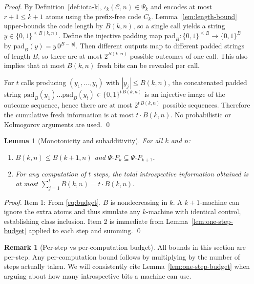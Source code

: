 \documentclass[11pt]{article}
\newtheorem{lemma}[theorem]{Lemma}
\theoremstyle{plain}
\theoremstyle{definition}
\newtheorem{remark}[theorem]{Remark}
\newcommand{\PSi}{\Psi}
\newcommand{\bits}{\{0,1\}}
\begin{document}
\begin{proof}
By Definition~\ref{def:iota-k}, $\iota_k(\mathcal{C},n)\in\PSi_k$ and encodes at most $r+1\le k+1$ atoms using the prefix-free code $C_k$. Lemma~\ref{lem:length-bound} upper-bounds the code length by $B(k,n)$, so a single call yields a string $y\in\bits^{\le B(k,n)}$. Define the injective padding map $\mathrm{pad}_B: \bits^{\le B}\to\bits^{B}$ by $\mathrm{pad}_B(y)=y\,0^{B-|y|}$. Then different outputs map to different padded strings of length $B$, so there are at most $2^{B(k,n)}$ possible outcomes of one call. This also implies that at most $B(k,n)$ fresh bits can be revealed per call.

For $t$ calls producing $(y_1,\ldots,y_t)$ with $|y_j|\le B(k,n)$, the concatenated padded string $\mathrm{pad}_B(y_1)\ldots\mathrm{pad}_B(y_t)\in\bits^{t\,B(k,n)}$ is an injective image of the outcome sequence, hence there are at most $2^{t\,B(k,n)}$ possible sequences. Therefore the cumulative fresh information is at most $t\cdot B(k,n)$. No probabilistic or Kolmogorov arguments are used. \qed
\end{proof}

\begin{lemma}[Monotonicity and subadditivity]
\label{lem:monotone}
For all $k$ and $n$:
\begin{enumerate}
  \item $B(k,n)\le B(k+1,n)$ and $\PSi\text{-}P_k\subseteq \PSi\text{-}P_{k+1}$.
  \item For any computation of $t$ steps, the total introspective information obtained is at most $\sum_{j=1}^{t} B(k,n) = t\cdot B(k,n)$.
\end{enumerate}
\end{lemma}

\begin{proof}
Item 1: From \eqref{eq:budget}, $B$ is nondecreasing in $k$. A $k{+}1$-machine can ignore the extra atoms and thus simulate any $k$-machine with identical control, establishing class inclusion. Item 2 is immediate from Lemma~\ref{lem:one-step-budget} applied to each step and summing. \qed
\end{proof}

\begin{remark}[Per-step vs per-computation budget]
All bounds in this section are per-step. Any per-computation bound follows by multiplying by the number of steps actually taken. We will consistently cite Lemma~\ref{lem:one-step-budget} when arguing about how many introspective bits a machine can use.
\end{remark}
\end{document}
